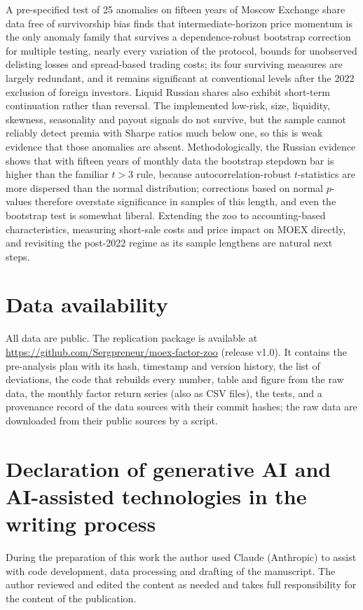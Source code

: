 \documentclass[11pt]{article}
\begin{document}
A pre-specified test of 25 anomalies on fifteen years of Moscow Exchange share data free of survivorship bias finds
that
intermediate-horizon price momentum is the only anomaly family that survives a dependence-robust bootstrap correction
for multiple testing, nearly every variation of the protocol, bounds for unobserved delisting losses and spread-based
trading costs; its four surviving measures are largely redundant, and it remains significant at
conventional levels after the 2022 exclusion of foreign investors. Liquid Russian shares also exhibit short-term
continuation rather than reversal. The implemented low-risk, size, liquidity, skewness, seasonality and payout signals
do not survive, but the sample cannot reliably detect premia with Sharpe ratios much below one, so this is weak
evidence that those anomalies are absent. Methodologically, the Russian evidence shows that with fifteen years of
monthly data the bootstrap stepdown bar is higher than the familiar $t>3$ rule, because autocorrelation-robust
$t$-statistics are more dispersed than the normal distribution; corrections based on normal $p$-values therefore
overstate significance in samples of this length, and even the bootstrap test is somewhat liberal. Extending the zoo
to accounting-based characteristics, measuring short-sale costs and price impact on MOEX directly, and revisiting the
post-2022 regime as its sample lengthens are natural next steps.

\section*{Data availability}
All data are public. The replication package is available at \url{https://github.com/Sergpreneur/moex-factor-zoo}
(release v1.0). It contains the pre-analysis plan with its hash, timestamp and version history, the list of
deviations, the code that rebuilds every number, table and figure from the raw data, the monthly factor return series
(also as CSV files), the tests, and a provenance record of the data sources with their commit hashes; the raw data are
downloaded from their public sources by a script.

\section*{Declaration of generative AI and AI-assisted technologies in the writing process}
During the preparation of this work the author used Claude (Anthropic) to assist with code development, data processing
and drafting of the manuscript. The author reviewed and edited the content as needed and takes full responsibility for
the content of the publication.
\end{document}
